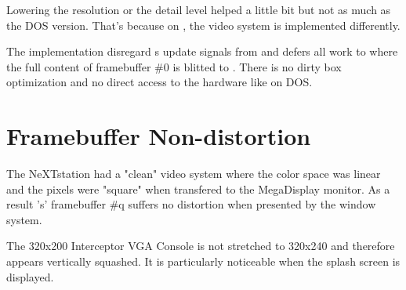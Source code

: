 \par
Lowering the resolution or the detail level helped a little bit but not as much as the DOS version. That's because on \NeXTns{}, the video system is implemented differently.\\
\par
 The implementation disregard   s update signals from  and defers all work to  where the full content of framebuffer \#0 is blitted to . There is no dirty box optimization and no direct access to the hardware like on DOS.\\
\par
{}

\section{Framebuffer Non-distortion}
The NeXTstation had a "clean" video system where the color space was linear and the pixels were "square" when transfered to the MegaDisplay monitor. As a result \doom{}'s' framebuffer \#q suffers no distortion when presented by the window system.\\
\par
The 320x200 Interceptor VGA Console  is not stretched to 320x240 and therefore appears vertically squashed. It is particularly noticeable when the splash screen is displayed.\\
\par
{}
\par
{}
\par
{}
